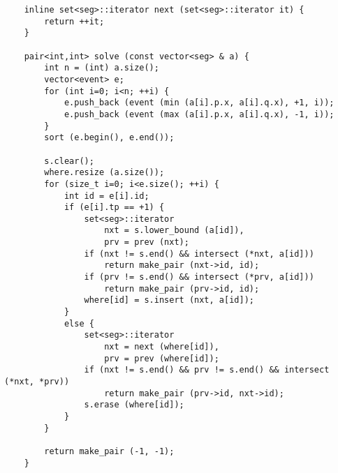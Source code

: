 \documentclass{article}
\begin{document}
\begin{verbatim}
    inline set<seg>::iterator next (set<seg>::iterator it) {
        return ++it;
    }
     
    pair<int,int> solve (const vector<seg> & a) {
        int n = (int) a.size();
        vector<event> e;
        for (int i=0; i<n; ++i) {
            e.push_back (event (min (a[i].p.x, a[i].q.x), +1, i));
            e.push_back (event (max (a[i].p.x, a[i].q.x), -1, i));
        }
        sort (e.begin(), e.end());
     
        s.clear();
        where.resize (a.size());
        for (size_t i=0; i<e.size(); ++i) {
            int id = e[i].id;
            if (e[i].tp == +1) {
                set<seg>::iterator
                    nxt = s.lower_bound (a[id]),
                    prv = prev (nxt);
                if (nxt != s.end() && intersect (*nxt, a[id]))
                    return make_pair (nxt->id, id);
                if (prv != s.end() && intersect (*prv, a[id]))
                    return make_pair (prv->id, id);
                where[id] = s.insert (nxt, a[id]);
            }
            else {
                set<seg>::iterator
                    nxt = next (where[id]),
                    prv = prev (where[id]);
                if (nxt != s.end() && prv != s.end() && intersect (*nxt, *prv))
                    return make_pair (prv->id, nxt->id);
                s.erase (where[id]);
            }
        }
     
        return make_pair (-1, -1);
    }
\end{verbatim}
\end{document}
